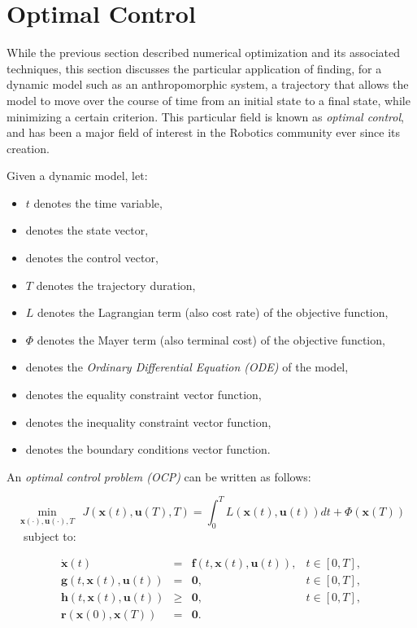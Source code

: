 \section{Optimal Control}

While the previous section described numerical optimization and its
associated techniques, this section discusses the particular
application of finding, for a dynamic model such as an anthropomorphic
system, a trajectory that allows the model to move over the course of
time from an initial state to a final state, while minimizing a
certain criterion. This particular field is known as \emph{optimal
  control}, and has been a major field of interest in the Robotics
community ever since its creation.

\bigskip

Given a dynamic model, let:
\begin{itemize}[noitemsep,nolistsep]
\item $t$ denotes the time variable,
\item \state{} denotes the state vector,
\item \control{} denotes the control vector,
\item $T$ denotes the trajectory duration,
\item $L$ denotes the Lagrangian term (also cost rate) of the
  objective function,
\item $\Phi$ denotes the Mayer term (also terminal cost) of the
  objective function,
\item \dfcn{} denotes the \emph{Ordinary Differential Equation (ODE)}
  of the model,
\item \eqcstr{} denotes the equality constraint vector function,
\item \ineqcstr{} denotes the inequality constraint vector function,
\item \bndcstr{} denotes the boundary conditions vector function.
\end{itemize}
\vspace{\baselineskip}

An \emph{optimal control problem (OCP)} can be written as follows:

\label{OCP}
\begin{equation}
  \min_{\mathbf{x} (\cdot), \mathbf{u} (\cdot), T} \ \ 
  J(\mathbf{x}(t),\mathbf{u}(T),T) = \int_{0}^{T}L (\mathbf{x}(t), \mathbf{u}(t))dt + \Phi(\mathbf{x}(T))
  \label{OCP:Obj}
\end{equation}
\ \ \ subject to:

\begin{equation}
  \begin{array}{rclr}
  \dot{\mathbf{x}} (t) & = & \mathbf{f}(t, \mathbf{x}(t),
  \mathbf{u}(t)), & t\in[0,T],%
  \label{OCP:Model}%
  \\%
  \mathbf{g}(t, \mathbf{x}(t), \mathbf{u}(t)) & = & \mathbf{0}, & t\in[0,T],%
  \\%
  \mathbf{h}(t, \mathbf{x}(t), \mathbf{u}(t)) & \ge & \mathbf{0}, & t\in[0,T],%
  \\%
  \mathbf{r} (\mathbf{x}(0), \mathbf{x}(T)) & = & \mathbf{0}.%
  \\%
  \end{array}
\end{equation}


